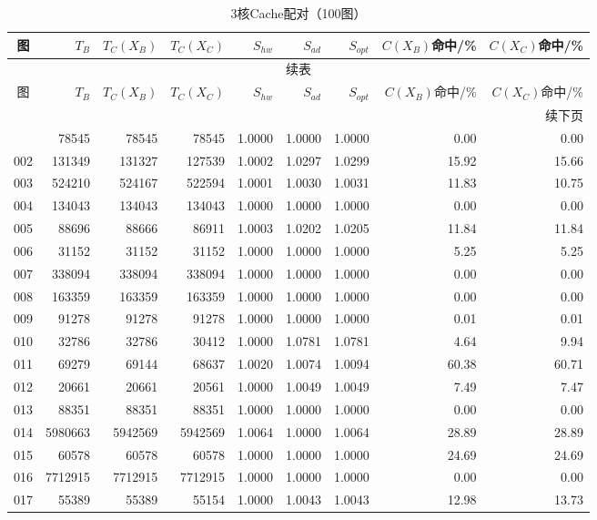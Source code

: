 \begin{longtable}{crrrrrrrr}
\caption{3核Cache配对（100图）}\label{tab:cache-detail-3}\\
\toprule
图 & $T_B$ & $T_C(X_B)$ & $T_C(X_C)$ & $S_{hw}$ & $S_{ad}$ & $S_{opt}$ & $C(X_B)$命中/\% & $C(X_C)$命中/\% \\
\midrule
\endfirsthead
\multicolumn{9}{c}{续表}\\
\toprule
图 & $T_B$ & $T_C(X_B)$ & $T_C(X_C)$ & $S_{hw}$ & $S_{ad}$ & $S_{opt}$ & $C(X_B)$命中/\% & $C(X_C)$命中/\% \\
\midrule
\endhead
\midrule\multicolumn{9}{r}{续下页}\\
\endfoot
\bottomrule
\endlastfoot
001 & 78545 & 78545 & 78545 & 1.0000 & 1.0000 & 1.0000 & 0.00 & 0.00 \\
002 & 131349 & 131327 & 127539 & 1.0002 & 1.0297 & 1.0299 & 15.92 & 15.66 \\
003 & 524210 & 524167 & 522594 & 1.0001 & 1.0030 & 1.0031 & 11.83 & 10.75 \\
004 & 134043 & 134043 & 134043 & 1.0000 & 1.0000 & 1.0000 & 0.00 & 0.00 \\
005 & 88696 & 88666 & 86911 & 1.0003 & 1.0202 & 1.0205 & 11.84 & 11.84 \\
006 & 31152 & 31152 & 31152 & 1.0000 & 1.0000 & 1.0000 & 5.25 & 5.25 \\
007 & 338094 & 338094 & 338094 & 1.0000 & 1.0000 & 1.0000 & 0.00 & 0.00 \\
008 & 163359 & 163359 & 163359 & 1.0000 & 1.0000 & 1.0000 & 0.00 & 0.00 \\
009 & 91278 & 91278 & 91278 & 1.0000 & 1.0000 & 1.0000 & 0.01 & 0.01 \\
010 & 32786 & 32786 & 30412 & 1.0000 & 1.0781 & 1.0781 & 4.64 & 9.94 \\
011 & 69279 & 69144 & 68637 & 1.0020 & 1.0074 & 1.0094 & 60.38 & 60.71 \\
012 & 20661 & 20661 & 20561 & 1.0000 & 1.0049 & 1.0049 & 7.49 & 7.47 \\
013 & 88351 & 88351 & 88351 & 1.0000 & 1.0000 & 1.0000 & 0.00 & 0.00 \\
014 & 5980663 & 5942569 & 5942569 & 1.0064 & 1.0000 & 1.0064 & 28.89 & 28.89 \\
015 & 60578 & 60578 & 60578 & 1.0000 & 1.0000 & 1.0000 & 24.69 & 24.69 \\
016 & 7712915 & 7712915 & 7712915 & 1.0000 & 1.0000 & 1.0000 & 0.00 & 0.00 \\
017 & 55389 & 55389 & 55154 & 1.0000 & 1.0043 & 1.0043 & 12.98 & 13.73 \\

\end{longtable}
